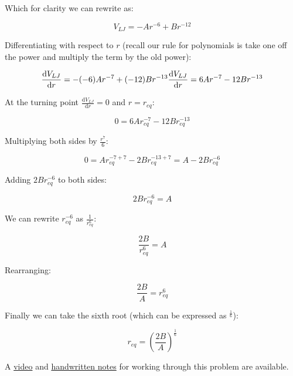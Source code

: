 \documentclass[
]{book}
\begin{document}
Which for clarity we can rewrite as:

\begin{equation*}
V_{LJ}=-Ar^{-6}+Br^{-12}
\end{equation*}

Differentiating with respect to \(r\) (recall our rule for polynomials is take one off the power and multiply the term by the old power):

\begin{equation*}
\frac{\textrm{d}V_{LJ}}{\textrm{d}r}= -(-6)Ar^{-7}+(-12)Br^{-13}\\
\frac{\textrm{d}V_{LJ}}{\textrm{d}r}= 6Ar^{-7}-12Br^{-13}
\end{equation*}

At the turning point \(\tfrac{\textrm{d}V_{LJ}}{\textrm{d}r}=0\) and \(r=r_{eq}\):

\begin{equation*}
0= 6Ar_{eq}^{-7}-12Br_{eq}^{-13}
\end{equation*}

Multiplying both sides by \(\frac{r^7}{6}\):

\begin{equation*}
0= Ar_{eq}^{-7+7}-2Br_{eq}^{-13+7}=A-2Br_{eq}^{-6}
\end{equation*}

Adding \(2Br_{eq}^{-6}\) to both sides:

\begin{equation*}
2Br_{eq}^{-6}= A
\end{equation*}

We can rewrite \(r_{eq}^{-6}\) as \(\tfrac{1}{r_{eq}^6}\):

\begin{equation*}
\frac{2B}{r_{eq}^{6}}= A
\end{equation*}

Rearranging:

\begin{equation*}
\frac{2B}{A}= r_{eq}^{6}
\end{equation*}

Finally we can take the sixth root (which can be expressed as \(^{\tfrac{1}{6}}\)):

\begin{equation*}
r_{eq} = \left( \frac{2B}{A} \right)^{\frac{1}{6}}
\end{equation*}

A \href{https://youtu.be/KSfeRXO3i_o}{video} and \href{http://workitoutwithapencil.xyz/wp-content/uploads/2021/08/Lennard-Jones-equilibrium-separation.pdf}{handwritten notes} for working through this problem are available.
\end{document}
